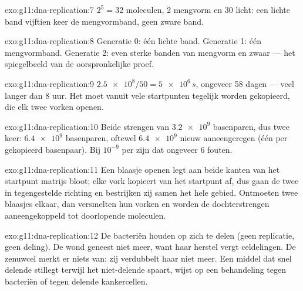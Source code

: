 \begin{solution}{exo:g11:dna-replication:7}
$2^5 = 32$ moleculen, 2 mengvorm en 30 licht: een lichte band vijftien
keer de mengvormband, geen zware band.
\end{solution}

\begin{solution}{exo:g11:dna-replication:8}
Generatie 0: één lichte band. Generatie 1: één mengvormband. Generatie 2:
even sterke banden van mengvorm en zwaar --- het spiegelbeeld van de
oorspronkelijke proef.
\end{solution}

\begin{solution}{exo:g11:dna-replication:9}
$\num{2.5e8}/50 = \num{5e6}\,\unit{s}$, ongeveer 58 dagen --- veel langer
dan 8 uur. Het  moet vanuit vele startpunten tegelijk worden
gekopieerd, die elk twee vorken openen.
\end{solution}

\begin{solution}{exo:g11:dna-replication:10}
Beide strengen van $\num{3.2e9}$ basenparen, dus twee keer:
$\num{6.4e9}$ basenparen, oftewel $\num{6.4e9}$ nieuw aaneengeregen
 (één per gekopieerd basenpaar). Bij $10^{-9}$ per 
zijn dat ongeveer 6 fouten.
\end{solution}

\begin{solution}{exo:g11:dna-replication:11}
Een blaasje openen legt aan beide kanten van het startpunt matrijs bloot;
elke vork kopieert van het startpunt af, dus gaan de twee in
tegengestelde richting en bestrijken zij samen het hele gebied. Ontmoeten
twee blaasjes elkaar, dan versmelten hun vorken en worden de
dochterstrengen aaneengekoppeld tot doorlopende moleculen.
\end{solution}

\begin{solution}{exo:g11:dna-replication:12}
De bacteriën houden op zich te delen (geen replicatie, geen deling). De
wond geneest niet meer, want haar herstel vergt celdelingen. De zenuwcel
merkt er niets van: zij verdubbelt haar  niet meer. Een middel dat
snel delende  stillegt terwijl het niet-delende spaart, wijst op
een behandeling tegen bacteriën of tegen delende kankercellen.
\end{solution}

